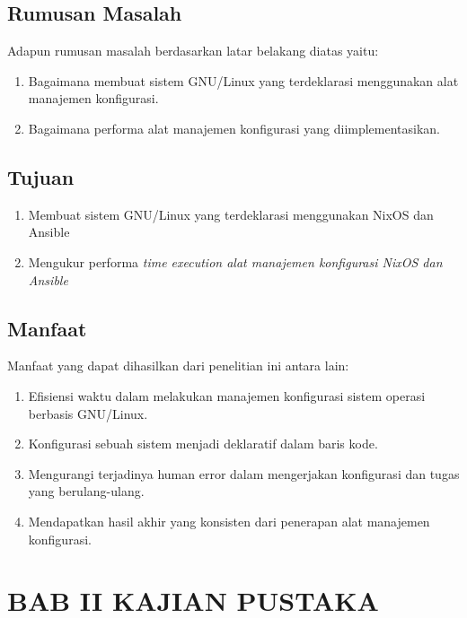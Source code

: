 \documentclass[10pt,]{report}
\begin{document}
\section{Rumusan Masalah}
\vspace{-3mm}
\begin{adjustwidth}{0.70cm}{}
Adapun rumusan masalah berdasarkan latar belakang diatas yaitu:
\begin{enumerate}
  \item Bagaimana membuat sistem GNU/Linux yang terdeklarasi menggunakan alat
    manajemen konfigurasi.
  \item Bagaimana performa alat manajemen konfigurasi yang diimplementasikan.
\end{enumerate}
\end{adjustwidth}
% 
\section{Tujuan}
\vspace{-3mm}
\begin{adjustwidth}{0.70cm}{}
  \begin{enumerate}
    \item Membuat sistem GNU/Linux yang terdeklarasi menggunakan NixOS dan 
      Ansible
    \item Mengukur performa \it{time execution} alat manajemen konfigurasi
      NixOS dan Ansible
  \end{enumerate}
\end{adjustwidth}
\vspace{3mm}
\section{Manfaat}
\vspace{-3mm}
\begin{adjustwidth}{0.70cm}{}
  Manfaat yang dapat dihasilkan dari penelitian ini antara lain:
  \begin{enumerate}
    \item Efisiensi waktu dalam melakukan manajemen konfigurasi sistem operasi berbasis GNU/Linux.
    \item Konfigurasi sebuah sistem menjadi deklaratif dalam baris kode.
    \item Mengurangi terjadinya human error dalam mengerjakan konfigurasi dan tugas yang berulang-ulang.
    \item Mendapatkan hasil akhir yang konsisten dari penerapan alat manajemen konfigurasi.

  \end{enumerate}
  
\end{adjustwidth} 
\chapter*{BAB II KAJIAN PUSTAKA}
\end{document}
